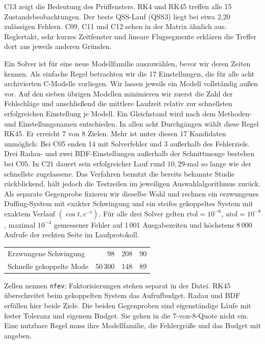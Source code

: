 C13 zeigt die Bedeutung des Prüffensters. RK4 und RK45 treffen alle 15 Zustandsbeobachtungen. Der beste QSS-Lauf (QSS3) liegt bei etwa 2,20 zulässigen Fehlern. C09, C11 und C12 sehen in der Matrix ähnlich aus. Reglertakt, sehr kurzes Zeitfenster und lineare Flugsegmente erklären die Treffer dort aus jeweils anderen Gründen.

Ein Solver ist für eine neue Modellfamilie auszuwählen, bevor wir deren Zeiten kennen. Als einfache Regel betrachten wir die 17 Einstellungen, die für alle acht archivierten C-Modelle vorliegen. Wir lassen jeweils ein Modell vollständig außen vor. Auf den sieben übrigen Modellen minimieren wir zuerst die Zahl der Fehlschläge und anschließend die mittlere Laufzeit relativ zur schnellsten erfolgreichen Einstellung je Modell. Ein Gleichstand wird nach dem Methoden- und Einstellungsnamen entschieden.
In allen acht Durchgängen wählt diese Regel RK45. Er erreicht 7 von 8 Zielen. Mehr ist unter diesen 17 Kandidaten unmöglich: Bei C05 enden 14 mit Solverfehler und 3 außerhalb des Fehlerziels. Drei Radau- und zwei BDF-Einstellungen außerhalb der Schnittmenge bestehen bei C05. In C21 dauert sein erfolgreicher Lauf rund \(10{,}29\)-mal so lange wie der schnellste zugelassene. Das Verfahren benutzt die bereits bekannte Studie rückblickend, hält jedoch die Testzeilen im jeweiligen Auswahlalgorithmus zurück.
Als separate Gegenprobe fixieren wir dieselbe Wahl und rechnen ein erzwungenes Duffing-System mit exakter Schwingung und ein steifes gekoppeltes System mit exaktem Verlauf \((\cos t,e^{-t})\). Für alle drei Solver gelten \(\mathrm{rtol}=10^{-6}\), \(\mathrm{atol}=10^{-8}\), maximal \(10^{-4}\) gemessener Fehler auf 1\,001 Ausgabezeiten und höchstens 8\,000 Aufrufe der rechten Seite im Laufprotokoll.
{\tblstart\begin{tabularx}{\linewidth}{@{}Yrrr@{}}\toprule
{}&&&\\\midrule
Erzwungene Schwingung&98&208&90\\
Schnelle gekoppelte Mode&50\,300&148&89\\\bottomrule\end{tabularx}\par}
Zellen nennen \texttt{nfev}; Faktorisierungen stehen separat in der Datei. RK45 überschreitet beim gekoppelten System das Aufrufbudget. Radau und BDF erfüllen hier beide Ziele. Die beiden Gegenproben sind eigenständige Läufe mit fester Toleranz und eigenem Budget. Sie gehen in die 7-von-8-Quote nicht ein. Eine nutzbare Regel muss ihre Modellfamilie, die Fehlergröße und das Budget mit angeben.


